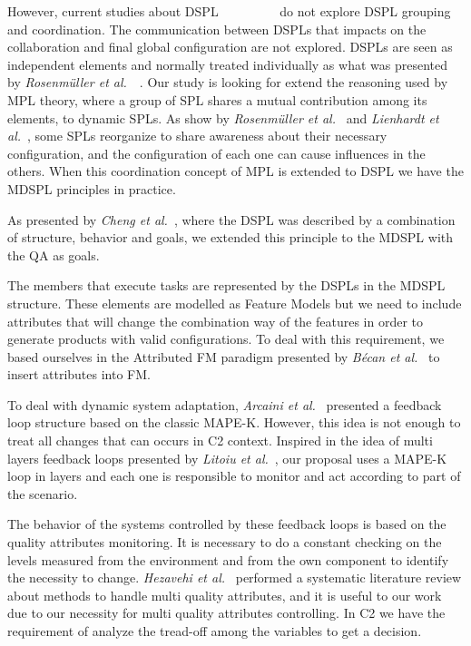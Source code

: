 However, current studies about DSPL~\cite{DSPL01-01}~\cite{DSPL01-02}~\cite{Rosenmuller2011}~\cite{DSPL01-04}~\cite{DSPL01-05}~\cite{Pessoa2017}~\cite{BencomoHA12}~\cite{ShariflooMQBP16}~\cite{7194657} do not explore DSPL grouping and coordination. The communication between DSPLs that impacts on the collaboration and final global configuration are not explored. DSPLs are seen as independent elements and normally treated individually as what was presented by \textit{Rosenm\"uller et al.}~\cite{Rosenmuller2011}~\cite{Rosenmuller2010}. Our study is looking for extend the reasoning used by MPL theory, where a group of SPL shares a mutual contribution among its elements, to dynamic SPLs. As show by \textit{Rosenm\"uller et al.}~\cite{Rosenmuller2010} and \textit{Lienhardt et al.}~\cite{Lienhardt2018}, some SPLs reorganize to share awareness about their necessary configuration, and the configuration of each one can cause influences in the others. When this coordination concept of MPL is extended to DSPL we have the MDSPL principles in practice. 

As presented by \textit{Cheng et al.}~\cite{Cheng2009}, where the DSPL was described by a combination of structure, behavior and goals, we extended this principle to the MDSPL with the QA as goals.

The members that execute tasks are represented by the DSPLs in the MDSPL structure. These elements are modelled as Feature Models but we need to include attributes that will change the combination way of the features in order to generate products with valid configurations. To deal with this requirement, we based ourselves in the Attributed FM paradigm presented by \textit{Bécan et al.}~\cite{DSPL100-1} to insert attributes into FM.

To deal with dynamic system adaptation, \textit{Arcaini et al.}~\cite{MAPE01} presented a feedback loop structure based on the classic MAPE-K. However, this idea is not enough to treat all changes that can occurs in C2 context. Inspired in the idea of multi layers feedback loops presented by \textit{Litoiu et al.}~\cite{MAPE02}, our proposal uses a MAPE-K loop in layers and each one is responsible to monitor and act according to part of the scenario.

The behavior of the systems controlled by these feedback loops is based on the quality attributes monitoring. It is necessary to do a constant checking on the levels measured from the environment and from the own component to identify the necessity to change. \textit{Hezavehi et al.}~\cite{SAS_001} performed a systematic literature review about methods to handle multi quality attributes, and it is useful to our work due to our necessity for multi quality attributes controlling. In C2 we have the requirement of analyze the tread-off among the variables to get a decision.

